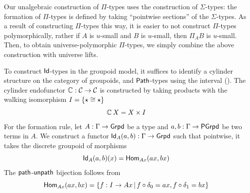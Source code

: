 \begin{definition}
Our unalgebraic construction of $\Pi$-types
uses the construction of $\Sigma$-types:
the formation of $\Pi$-types is defined by
taking ``pointwise sections'' of the $\Sigma$-types.
As a result of constructing $\Pi$-types this way,
it is easier to not construct $\Pi$-types polymorphically, rather
if $A$ is $u$-small and $B$ is $u$-small, then $\Pi_A B$ is $u$-small.
Then, to obtain universe-polymorphic $\Pi$-types,
we simply combine the above construction with universe lifts.
\end{definition}

\begin{definition}
  \label{def:elementary-id-type}
To construct $\mathsf{Id}$-types in the groupoid model,
it suffices to identify a cylinder structure on the category of groupoids,
and $\mathop{\mathsf{Path}}$-types using the interval ().
The cylinder endofunctor $\mathop{\mathbb{C}_{}} : \mathcal{C} \to \mathcal{C}$ is constructed
by taking products with the walking isomorphism $I = \{\star \cong \star\}$
\[ \mathop{\mathbb{C}_{}} X = X \times I\]
For the formation rule,
let $A : \Gamma \to \mathsf{Grpd}$ be a type and $a, b : \Gamma \to \mathsf{PGrpd}$ be two terms
in $A$.
We construct a functor $\mathsf{Id}_A (a,b) : \Gamma \to \mathsf{Grpd}$ such that
pointwise, it takes the discrete groupoid of morphisms
\[ \mathsf{Id}_A (a,b) (x) = \mathsf{Hom}_{A x} (a x, b x)\]
The $\mathop{\mathsf{path}}$-$\mathop{\mathsf{unpath}}$ bijection follows from
\[ \mathsf{Hom}_{A x} (a x, b x) = \{ f : I \to A x \,|\, f \circ \delta_0 = a x, f \circ \delta_1  = b x\}\]


\end{definition}
